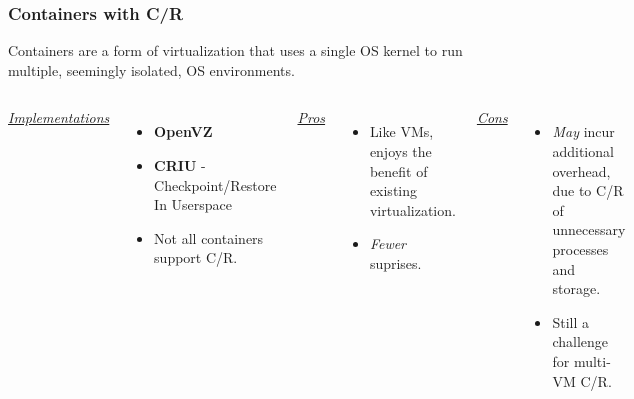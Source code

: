 \documentclass[compress]{beamer}
\begin{document}

\begin{frame}
\frametitle{Containers with C/R}
Containers are a form of virtualization that uses a single OS
kernel to run multiple, seemingly isolated, OS environments.
\begin{columns}[t]
\ul{\textit{Implementations}}
\begin{itemize}
\item \textbf{OpenVZ}
\item \textbf{CRIU} - Checkpoint/Restore In Userspace
\item Not all containers support C/R.
\end{itemize}

\ul{\textit{Pros}}
\begin{itemize}
\item Like VMs, enjoys the benefit of existing virtualization.
\item \textit{Fewer} suprises.
\end{itemize}

\ul{\textit{Cons}}
\begin{itemize}
\item \textit{May} incur additional overhead, due to C/R of
unnecessary processes and storage.
\item Still a challenge for multi-VM C/R.
\end{itemize}

\end{columns}

\end{frame}
  
\end{document}

